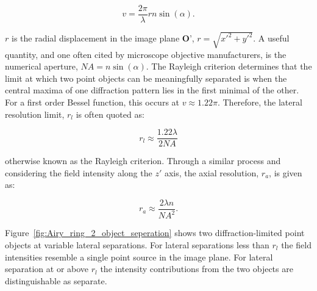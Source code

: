 \begin{equation}\label{eq:normalised_lateral}
v = \frac{2\pi}{\lambda}rn\sin(\alpha).
\end{equation}

$r$ is the radial displacement in the image plane $\textbf{O'}$, $r = \sqrt{x'^{2} + y'^{2}}$. 
A useful quantity, and one often cited by microscope objective manufacturers, 
is the numerical aperture, $NA = n\sin(\alpha)$. The Rayleigh criterion 
determines that the limit at which two point objects can be meaningfully 
separated is when the central maxima of one diffraction pattern lies in the
first minimal of the other\cite{rayleigh1874xii,rayleigh1880investigations}. For a first order Bessel 
function, this occurs at $v \approx 1.22\pi$. Therefore, the lateral resolution 
limit, $r_l$ is often quoted as:

\begin{equation}\label{eq:lateral_res}
r_l \approx \frac{1.22\lambda}{2NA}
\end{equation}

otherwise known as the Rayleigh criterion\cite{rayleigh1874xii}. Through
a similar process and considering the field intensity along the $z'$ axis, the
axial resolution, $r_a$, is given as\cite{pawley2006handbook}:

\begin{equation}\label{eq:axial_res}
r_a \approx \frac{2\lambda n}{NA^{2}}.
\end{equation}

Figure~\ref{fig:Airy_ring_2_object_seperation} shows two 
diffraction-limited point objects at variable lateral separations. For 
lateral separations less than $r_{l}$ the field intensities resemble a single 
point source in the image plane. For lateral separation at or above $r_{l}$ 
the intensity contributions from the two objects are distinguishable as 
separate.

